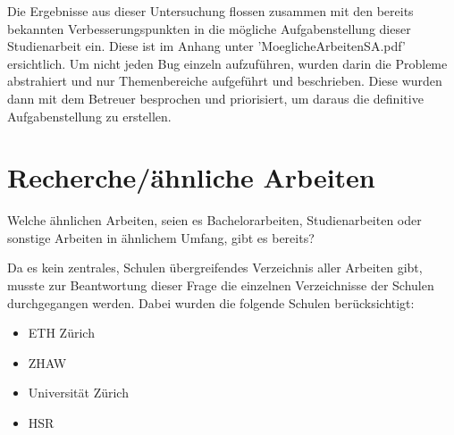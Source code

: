 Die Ergebnisse aus dieser Untersuchung flossen zusammen mit den bereits bekannten Verbesserungspunkten in die mögliche Aufgabenstellung dieser Studienarbeit ein. Diese ist im Anhang unter 'MoeglicheArbeitenSA.pdf' ersichtlich. Um nicht jeden Bug einzeln aufzuführen, wurden darin die Probleme abstrahiert und nur Themenbereiche aufgeführt und beschrieben. Diese wurden dann mit dem Betreuer besprochen und priorisiert, um daraus die definitive Aufgabenstellung zu erstellen.

\newpage

\section{Recherche/ähnliche Arbeiten}

Welche ähnlichen Arbeiten, seien es Bachelorarbeiten, Studienarbeiten oder sonstige Arbeiten in ähnlichem Umfang, gibt es bereits?

Da es kein zentrales, Schulen übergreifendes Verzeichnis aller Arbeiten gibt, musste zur Beantwortung dieser Frage die einzelnen Verzeichnisse der Schulen durchgegangen werden. Dabei wurden die folgende Schulen berücksichtigt:
\begin{itemize}
	\item ETH Zürich
	\item ZHAW
	\item Universität Zürich
	\item HSR
\end{itemize}

\bigskip

